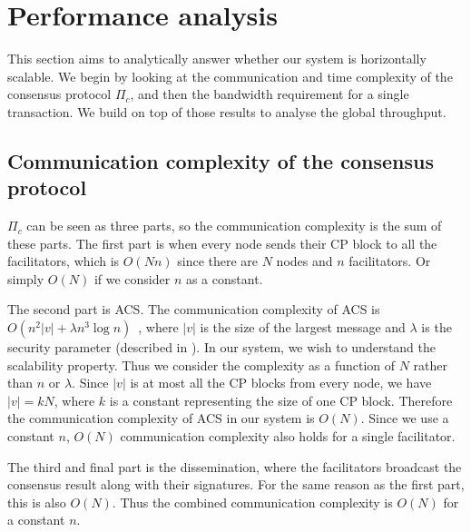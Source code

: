 \section{Performance analysis}
\label{sec:performance-analysis}
This section aims to analytically answer whether our system is horizontally scalable.
We begin by looking at the communication and time complexity of the consensus protocol $\Pi_c$,
and then the bandwidth requirement for a single transaction.
We build on top of those results to analyse the global throughput.

\subsection{Communication complexity of the consensus protocol}
\label{sec:cons-complexity}
$\Pi_c$ can be seen as three parts,
so the communication complexity is the sum of these parts.
The first part is when every node sends their CP block to all the facilitators, which is $O(Nn)$ since there are $N$ nodes and $n$ facilitators.
Or simply $O(N)$ if we consider $n$ as a constant.

The second part is ACS.
The communication complexity of ACS is $O(n^2|v| + \lambda n^3 \log n)$~\cite{miller2016honey},
where $|v|$ is the size of the largest message and $\lambda$ is the security parameter (described in ).
In our system, we wish to understand the scalability property.
Thus we consider the complexity as a function of $N$ rather than $n$ or $\lambda$.
Since $|v|$ is at most all the CP blocks from every node, we have $|v| = kN$,
where $k$ is a constant representing the size of one CP block.
Therefore the communication complexity of ACS in our system is $O(N)$.
Since we use a constant $n$, $O(N)$ communication complexity also holds for a single facilitator.

The third and final part is the dissemination, where the facilitators broadcast the consensus result along with their signatures.
For the same reason as the first part, this is also $O(N)$.
Thus the combined communication complexity is $O(N)$ for a constant $n$.


